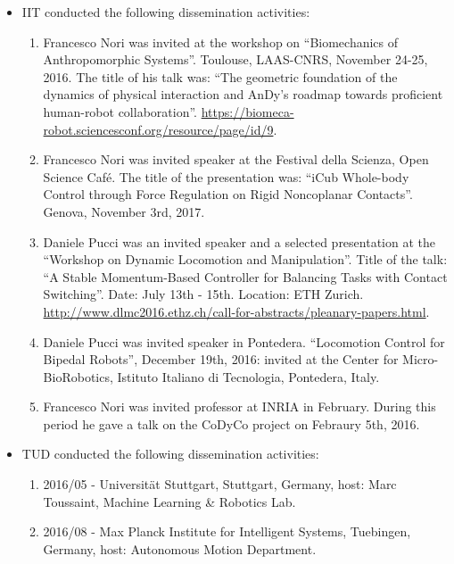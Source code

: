 \begin{itemize}
 \item IIT conducted the following dissemination activities:
 
 \begin{enumerate}
 \item Francesco Nori was invited at the workshop on ``Biomechanics of Anthropomorphic Systems''.
 Toulouse, LAAS-CNRS, November 24-25, 2016. The title of his talk was: ``The geometric foundation
 of the dynamics of physical interaction and AnDy’s roadmap towards proficient human-robot collaboration''.
 \url{https://biomeca-robot.sciencesconf.org/resource/page/id/9}. 
 
 \item Francesco Nori was invited speaker at the Festival della Scienza, Open Science Caf\'e. The title of the 
 presentation was: ``iCub Whole-body Control through Force Regulation on Rigid Noncoplanar Contacts''.
 Genova, November 3rd, 2017.
 
 \item Daniele Pucci was an invited speaker and a selected presentation at the
 ``Workshop on Dynamic Locomotion and Manipulation''. Title of the talk:
 ``A Stable Momentum-Based Controller for Balancing Tasks with Contact Switching''.
 Date: July 13th - 15th. Location: ETH Zurich.
 \url{http://www.dlmc2016.ethz.ch/call-for-abstracts/pleanary-papers.html}.
 
 \item Daniele Pucci was invited speaker in Pontedera. “Locomotion Control for Bipedal Robots”,
 December 19th, 2016: invited at the Center for Micro-BioRobotics, Istituto Italiano di Tecnologia,
 Pontedera, Italy.
 
 \item Francesco Nori was invited professor at INRIA in February. During this period he gave a
 talk on the CoDyCo project on Febraury 5th, 2016.
 
 
 \end{enumerate}
 
 \item TUD conducted the following dissemination activities:
 
 \begin{enumerate}
 \item 2016/05 - Universit\"at Stuttgart, Stuttgart, Germany, host: Marc Toussaint, Machine Learning \& Robotics Lab.
 \item 2016/08 - Max Planck Institute for Intelligent Systems, Tuebingen, Germany, host: Autonomous Motion Department.


\end{enumerate}
\end{itemize}
